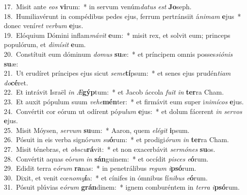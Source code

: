 {17.~}Misit ante \textit{e}\textit{os} \textbf{vi}rum:~* in servum venúm\textit{da}\textit{tus} \textit{est} \textbf{Jo}seph.\\
{18.~}Humiliavérunt in compédibus pedes ejus, ferrum pertránsiit á\textit{ni}\textit{mam} \textbf{e}jus~* donec vení\textit{ret} \textit{ver}\textit{bum} \textbf{e}jus.\\
{19.~}Elóquium Dómini inflam\textit{má}\textit{vit} \textbf{e}um:~* misit rex, et solvit eum; princeps populórum, et \textit{di}\textit{mí}\textit{sit} \textbf{e}um.\\
{20.~}Constítuit eum dóminum \textit{do}\textit{mus} \textbf{su}æ:~* et príncipem omnis posses\textit{si}\textit{ó}\textit{nis} \textbf{su}æ:\\
{21.~}Ut erudíret príncipes ejus sicut \textit{se}\textit{me}\textbf{tí}psum:~* et senes ejus prudén\textit{ti}\textit{am} \textit{do}\textbf{cé}ret.\\
{22.~}Et intrávit Israël \textit{in} \textit{Æ}\textbf{gýp}tum:~* et Jacob áccola \textit{fu}\textit{it} \textit{in} \textbf{ter}ra Cham.\\
{23.~}Et auxit pópulum suum \textit{ve}\textit{he}\textbf{mén}ter:~* et firmávit eum super i\textit{ni}\textit{mí}\textit{cos} \textbf{e}jus.\\
{24.~}Convértit cor eórum ut odírent pó\textit{pu}\textit{lum} \textbf{e}jus:~* et dolum fácerent \textit{in} \textit{ser}\textit{vos} \textbf{e}jus.\\
{25.~}Misit Móysen, \textit{ser}\textit{vum} \textbf{su}um:~* Aaron, quem \textit{e}\textit{lé}\textit{git} \textbf{i}psum.\\
{26.~}Pósuit in eis verba signó\textit{rum} \textit{su}\textbf{ó}rum:~* et prodigi\textit{ó}\textit{rum} \textit{in} \textbf{ter}ra Cham.\\
{27.~}Misit ténebras, et \textit{ob}\textit{scu}\textbf{rá}vit:~* et non exacerbávit \textit{ser}\textit{mó}\textit{nes} \textbf{su}os.\\
{28.~}Convértit aquas eó\textit{rum} \textit{in} \textbf{sán}guinem:~* et occídit \textit{pi}\textit{sces} \textit{e}\textbf{ó}rum.\\
{29.~}Edidit terra e\textit{ó}\textit{rum} \textbf{ra}nas:~* in penetrálibus \textit{re}\textit{gum} \textit{i}\textbf{psó}rum.\\
{30.~}Dixit, et venit cœ\textit{no}\textit{my}\textbf{í}a:~* et cínifes in ómnibus fí\textit{ni}\textit{bus} \textit{e}\textbf{ó}rum.\\
{31.~}Pósuit plúvias e\textit{ó}\textit{rum} \textbf{grán}dinem:~* ignem comburéntem in \textit{ter}\textit{ra} \textit{i}\textbf{psó}rum.\\
